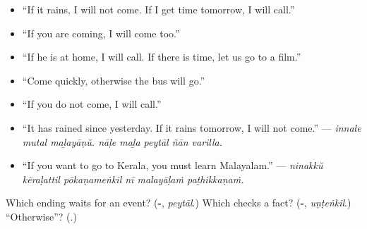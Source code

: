 \begin{itemize}
\raggedright
  \item \textquotedblleft{}If it rains, I will not come. If I get time tomorrow, I will call.\textquotedblright{}
  \item \textquotedblleft{}If you are coming, I will come too.\textquotedblright{}
  \item \textquotedblleft{}If he is at home, I will call. If there is time, let us go to a film.\textquotedblright{}
  \item \textquotedblleft{}Come quickly, otherwise the bus will go.\textquotedblright{}
  \item \textquotedblleft{}If you do not come, I will call.\textquotedblright{}
  \item \textquotedblleft{}It has rained since yesterday. If it rains tomorrow, I will not come.\textquotedblright{} — \emph{innale mutal maḻayāṇŭ. nāḷe maḻa peytāl ñān varilla.}
  \item \textquotedblleft{}If you want to go to Kerala, you must learn Malayalam.\textquotedblright{} — \emph{ninakkŭ kēraḷattil pōkaṇameṅkil nī malayāḷaṁ paṭhikkaṇaṁ.}
\end{itemize}

\begin{tcolorbox}[breakable,colback=teal!4,colframe=teal!35!black,title={Before you move on}]
Which ending waits for an event? (\textbf{-}, \emph{peytāl}.) Which checks a fact? (\textbf{-}, \emph{uṇṭeṅkil}.) \textquotedblleft{}Otherwise\textquotedblright{}? (\textbf{}.)
\end{tcolorbox}
